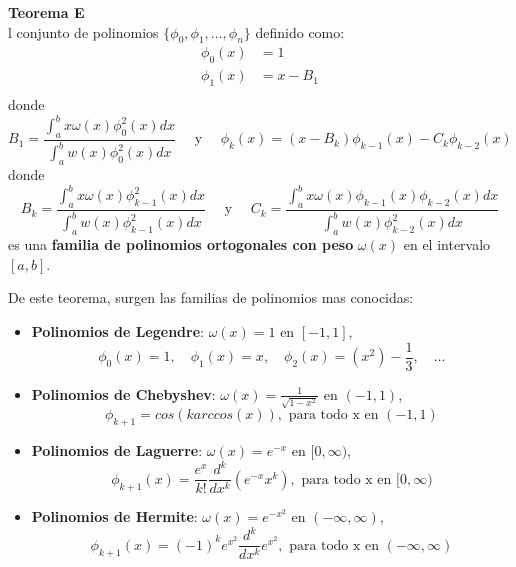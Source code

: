 \documentclass{article}
\newenvironment{theorem}[2][Teorema]
    { \begin{mdframed}[backgroundcolor=green!20] \textbf{#1 #2} \\}
    {  \end{mdframed}}
\begin{document}
\begin{theorem}
    El conjunto de polinomios $\{ \phi_0, \phi_1, \dots, \phi_n \}$ definido como:
    \begin{align}
        \phi_0(x) &= 1 \\
        \phi_1(x) &= x - B_1 \\
    \end{align}
    donde 
    \begin{equation}
        B_1 = \frac{\int_{a}^{b} x \omega(x) \phi_0^2(x) dx}{\int_{a}^{b} w(x)\phi_0^2(x) dx} \quad \text{ y } \quad \phi_k(x) = (x - B_k) \phi_{k-1}(x) - C_k \phi_{k-2}(x)
    \end{equation}
    donde
    \begin{equation}
        B_k = \frac{\int_{a}^{b} x \omega(x) \phi_{k-1}^2(x) dx}{\int_{a}^{b} w(x)\phi_{k-1}^2(x) dx} \quad \text{ y } \quad C_k = \frac{\int_{a}^{b} x \omega(x) \phi_{k-1}(x) \phi_{k-2}(x) dx}{\int_{a}^{b} w(x)\phi_{k-2}^2(x) dx}
    \end{equation}
    es una \textbf{familia de polinomios ortogonales con peso} $\omega(x)$ en el intervalo $[a,b]$.
\end{theorem}

De este teorema, surgen las familias de polinomios mas conocidas:
\begin{itemize}
    \item \textbf{Polinomios de Legendre}: $\omega(x) = 1$ en $[-1,1]$,
    \begin{equation}
        \phi_0 (x) = 1, \quad \phi_1(x) = x, \quad \phi_2(x) = (x^2) - \frac{1}{3}, \quad \dots
    \end{equation} 
    \item \textbf{Polinomios de Chebyshev}: $\omega(x) = \frac{1}{\sqrt{1-x^2}}$ en $(-1,1)$,
    \begin{equation}
        \phi_{k+1} = cos (k arc cos(x)), \text{ para todo x en } (-1,1)
    \end{equation}
    \item \textbf{Polinomios de Laguerre}: $\omega(x) = e^{-x}$ en $[0, \infty)$,
    \begin{equation}
        \phi_{k+1} (x) = \frac{e^x}{k!} \frac{d^k}{dx^k} (e^{-x}x^k), \text{ para todo x en } [0, \infty)
    \end{equation}
    \item \textbf{Polinomios de Hermite}: $\omega(x) = e^{-x^2}$ en $(-\infty, \infty)$,
    \begin{equation}
        \phi_{k+1} (x) = (-1)^k e^{x^2} \frac{d^k}{dx^k} e^{x^2}, \text{ para todo x en } (-\infty, \infty)
    \end{equation}
\end{itemize}
\end{document}
